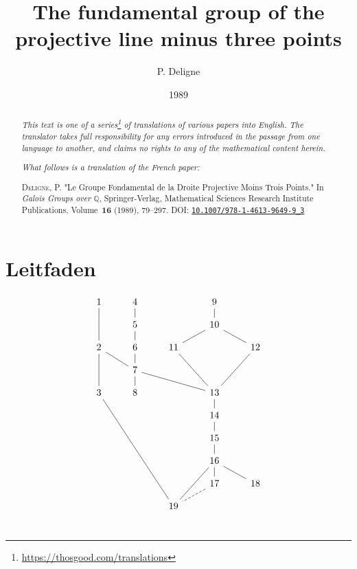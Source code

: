 \documentclass{article}
\title{The fundamental group of the projective line minus three points}
\author{P. Deligne}
\date{1989}
\newcommand{\doctype}{French paper}
\newcommand{\origcit}{%
  \textsc{Deligne, P.}
  "Le Groupe Fondamental de la Droite Projective Moins Trois Points."
  In \emph{Galois Groups over $\mathbb{Q}$}, Springer-Verlag, Mathematical Sciences Research Institute Publications, Volume~\textbf{16} (1989), 79--297.
  DOI: \href{https://doi.org/10.1007/978-1-4613-9649-9_3}{\texttt{10.1007/978-1-4613-9649-9\_3}}%
}
\theoremstyle{definition}
\begin{document}
\maketitle
\thispagestyle{fancy}

\renewcommand{\abstractname}{Translator's note.}

\begin{abstract}
  \renewcommand*{\thefootnote}{\fnsymbol{footnote}}
  \emph{This text is one of a series\footnote{\url{https://thosgood.com/translations}} of translations of various papers into English.}
  \emph{The translator takes full responsibility for any errors introduced in the passage from one language to another, and claims no rights to any of the mathematical content herein.}

  \medskip
  
  \emph{What follows is a translation of the \doctype:}

  \medskip\noindent
  \origcit
\end{abstract}

\setcounter{footnote}{0}

\tableofcontents
\bigskip




\section*{Leitfaden}
\[
  \begin{tikzcd}[row sep=1em]
    1 \ar[dd, no head] & 4 \ar[d, no head] & & 9 \ar[d, no head] &
  \\& 5 \ar[d, no head] & & 10 \ar[dl, no head] \ar[dr, no head] &
  \\2 \ar[dd, no head] \ar[dr, no head] & 6 \ar[d, no head] & 11 \ar[ddr, no head] & & 12 \ar[ddl, no head]
  \\& 7 \ar[d, no head] \ar[drr, no head] & & &
  \\3 \ar[dddddrr, no head] & 8 & & 13 \ar[d, no head] &
  \\ & & & 14 \ar[d, no head] &
  \\ & & & 15 \ar[d, no head] &
  \\ & & & 16 \ar[d, no head] \ar[dr, no head] \ar[ddl, no head] &
  \\ & & & 17 \ar[dl, no head, dashed] & 18
  \\ & & 19 & &
  \end{tikzcd}
\]


\section*{}
\end{document}
